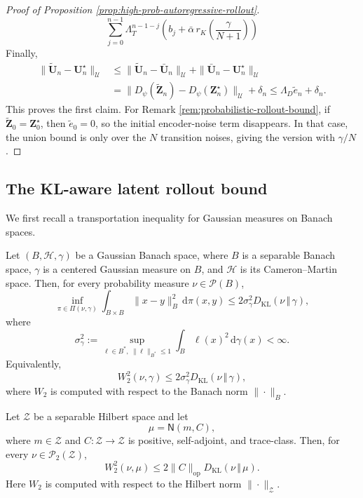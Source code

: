 \documentclass[11pt]{article}
\renewcommand{\d}{\mathrm{d}}
\begin{document}
\begin{proof}[Proof of Proposition \ref{prop:high-prob-autoregressive-rollout}]
\begin{equation*}
    \sum_{j=0}^{n-1}
    \Lambda_T^{n-1-j}
    \left(
        b_j
        +
        \bar\alpha\,
        r_K\left(\frac{\gamma}{N+1}\right)
    \right)
\end{equation*}
Finally,
\[
\begin{aligned}
    \|\widetilde{\mathbf U}_n-\mathbf U_n^\star\|_{\mathcal U}
    &\le
    \|\widetilde{\mathbf U}_n-\bar{\mathbf U}_n\|_{\mathcal U}
    +
    \|\bar{\mathbf U}_n-\mathbf U_n^\star\|_{\mathcal U}
    \\
    &=
    \|D_\psi(\widetilde{\mathbf Z}_n)-D_\psi(\mathbf Z_n^\star)\|_{\mathcal U}
    +
    \delta_n
    \le\Lambda_D\widetilde e_n+\delta_n.
\end{aligned}
\]
This proves the first claim. For Remark \ref{rem:probabilistic-rollout-bound}, if $\widetilde{\mathbf Z}_0=\mathbf Z_0^\star$, then
$\widetilde e_0=0$, so the initial encoder-noise term disappears. In that case, the union bound is
only over the $N$ transition noises, giving the version with $\gamma/N$.
\end{proof}

 \subsection{The KL-aware latent rollout bound}
\label{app:kl-aware-rollout}

We first recall a transportation inequality for Gaussian measures on Banach spaces.

\begin{theorem}
\label{thm:riedel-gaussian-t2}
Let $(B,\mathcal H,\gamma)$ be a Gaussian Banach space, where $B$ is a separable Banach space,
$\gamma$ is a centered Gaussian measure on $B$, and $\mathcal H$ is its Cameron--Martin space.
Then, for every probability measure $\nu\in\mathcal P(B)$,
\[
    \inf_{\pi\in\Pi(\nu,\gamma)}
    \int_{B\times B}
    \|x-y\|_B^2\,\d\pi(x,y)
    \le
    2\sigma_\gamma^2
    D_{\mathrm{KL}}(\nu\,\Vert\,\gamma),
\]
where
\[
    \sigma_\gamma^2
    :=
    \sup_{\ell\in B^\ast,\ \|\ell\|_{B^\ast}\le 1}
    \int_B \ell(x)^2\,\d\gamma(x)
    <\infty .
\]
Equivalently,
\[
    W_2^2(\nu,\gamma)
    \le
    2\sigma_\gamma^2
    D_{\mathrm{KL}}(\nu\,\Vert\,\gamma),
\]
where $W_2$ is computed with respect to the Banach norm $\|\cdot\|_B$.
\end{theorem}

\begin{lemma}
\label{lem:hilbert-gaussian-t2}
Let $\mathcal Z$ be a separable Hilbert space and let
\[
    \mu=\mathsf N(m,C),
\]
where $m\in\mathcal Z$ and $C:\mathcal Z\to\mathcal Z$ is positive, self-adjoint, and trace-class.
Then, for every $\nu\in\mathcal P_2(\mathcal Z)$,
\[
    W_2^2(\nu,\mu)
    \le
    2\|C\|_{\mathrm{op}}
    D_{\mathrm{KL}}(\nu\,\Vert\,\mu).
\]
Here $W_2$ is computed with respect to the Hilbert norm $\|\cdot\|_{\mathcal Z}$.
\end{lemma}
\end{document}
